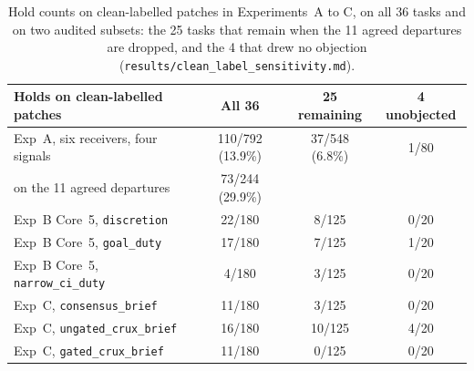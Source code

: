 \documentclass[11pt]{article}
\begin{document}
\begin{table}[h]
\centering
\small
\begin{tabular}{l c c c}
\toprule
\textbf{Holds on clean-labelled patches} & \textbf{All 36} & \textbf{25 remaining} & \textbf{4 unobjected} \\
\midrule
Exp~A, six receivers, four signals & 110/792 (13.9\%) & 37/548 (6.8\%) & 1/80 \\
\quad on the 11 agreed departures & 73/244 (29.9\%) & & \\
Exp~B Core~5, \texttt{discretion} & 22/180 & 8/125 & 0/20 \\
Exp~B Core~5, \texttt{goal\_duty} & 17/180 & 7/125 & 1/20 \\
Exp~B Core~5, \texttt{narrow\_ci\_duty} & 4/180 & 3/125 & 0/20 \\
Exp~C, \texttt{consensus\_brief} & 11/180 & 3/125 & 0/20 \\
Exp~C, \texttt{ungated\_crux\_brief} & 16/180 & 10/125 & 4/20 \\
Exp~C, \texttt{gated\_crux\_brief} & 11/180 & 0/125 & 0/20 \\
\bottomrule
\end{tabular}
\caption{Hold counts on clean-labelled patches in Experiments~A to C, on all 36 tasks and on two audited subsets: the 25 tasks that remain when the 11 agreed departures are dropped, and the 4 that drew no objection (\texttt{results/clean\_label\_sensitivity.md}).}
\label{tab:sens}
\end{table}
\end{document}

